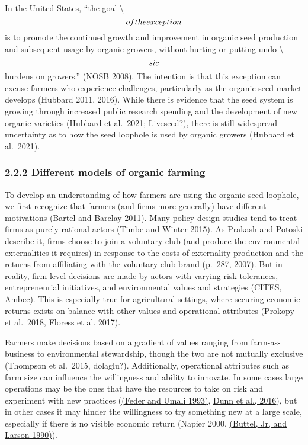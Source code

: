 \documentclass[twoside,12pt,final]{ucthesis-CA2012}
\begin{document}
\begin{ucmainmatter}
In the United States, ``the goal \textbackslash{}\[of the exception\\\] is to promote
the continued growth and improvement in organic seed production and
subsequent usage by organic growers, without hurting or putting undo
\textbackslash{}\[sic\\\] burdens on growers.'' (NOSB 2008). The intention is that
this exception can excuse farmers who experience challenges,
particularly as the organic seed market develops (Hubbard 2011, 2016).
While there is evidence that the seed system is growing through
increased public research spending and the development of new organic
varieties (Hubbard et al.~2021; Liveseed?), there is still widespread
uncertainty as to how the seed loophole is used by organic growers
(Hubbard et al.~2021).

\hypertarget{different-models-of-organic-farming}{%
\subsubsection{2.2.2 Different models of organic farming}\label{different-models-of-organic-farming}}

To develop an understanding of how farmers are using the organic seed
loophole, we first recognize that farmers (and firms more generally)
have different motivations (Bartel and Barclay 2011). Many policy design
studies tend to treat firms as purely rational actors (Timbe and Winter
2015). As Prakash and Potoski describe it, \textquotesingle firms choose to join a
voluntary club (and produce the environmental externalities it requires)
in response to the costs of externality production and the returns from
affiliating with the voluntary club brand\textquotesingle{} (p.~287, 2007). But in
reality, firm-level decisions are made by actors with varying risk
tolerances, entrepreneurial initiatives, and environmental values and
strategies (CITES, Ambec). This is especially true for agricultural
settings, where securing economic returns exists on balance with other
values and operational attributes (Prokopy et al.~2018, Floress et al.
2017).

Farmers make decisions based on a gradient of values ranging from
\textquotesingle farm-as-business\textquotesingle{} to \textquotesingle environmental stewardship\textquotesingle, though the two
are not mutually exclusive (Thompson et al.~2015, dolaglu?).
Additionally, operational attributes such as farm size can influence the
willingness and ability to innovate. In some cases large operations may
be the ones that have the resources to take on risk and experiment with
new practices (\href{https://www.zotero.org/google-docs/?4hXARi}{(Feder and Umali
1993)}, \href{https://www.zotero.org/google-docs/?broken=rs6XVC}{Dunn et al.,
2016}), but in other
cases it may hinder the willingness to try something new at a large
scale, especially if there is no visible economic return (Napier 2000,
\href{https://www.zotero.org/google-docs/?FI07wa}{(Buttel, Jr, and Larson
1990)}).


\end{ucmainmatter}
\end{document}
